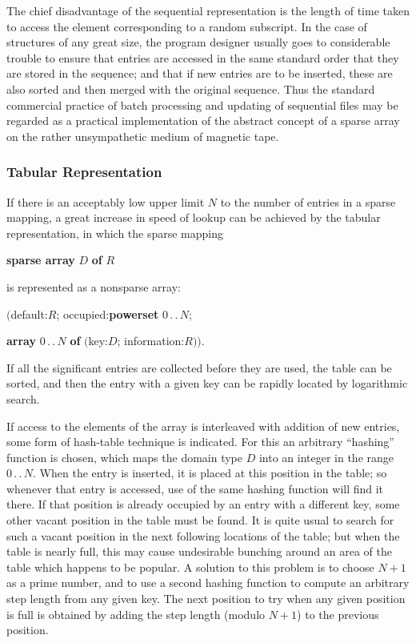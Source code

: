 The chief disadvantage of the sequential representation is the length of time taken to access the element corresponding to a random subscript. In the case of structures of any great size, the program designer usually goes to considerable trouble to ensure that entries are accessed in the same standard order that they are stored in the sequence; and that if new entries are to be inserted, these are also sorted and then merged with the original sequence. Thus the standard commercial practice of batch processing and updating of sequential files may be regarded as a practical implementation of the abstract concept of a sparse array on the rather unsympathetic medium of magnetic tape.

\subsubsection{Tabular Representation}

If there is an acceptably low upper limit $N$ to the number of entries in a sparse mapping, a great increase in speed of lookup can be achieved by the tabular representation, in which the sparse mapping

\quad \textbf{sparse array} $D$ \textbf{of} $R$

\noindent
is represented as a nonsparse array:

\quad $($default:$R$; occupied:\textbf{powerset} $0\,.\,.\,N$;

\tabto*{8em}\textbf{array} $0\,.\,.\,N$ \textbf{of} $($key:$D$; information:$R))$.

\noindent
If all the significant entries are collected before they are used, the table can be sorted, and then the entry with a given key can be rapidly located by logarithmic search.

If access to the elements of the array is interleaved with addition of new entries, some form of hash-table technique is indicated. For this an arbitrary ``hashing'' function is chosen, which maps the domain type $D$ into an integer in the range $0\,.\,.\,N$. When the entry is inserted, it is placed at this position in the table; so whenever that entry is accessed, use of the same hashing function will find it there. If that position is already occupied by an entry with a different key, some other vacant position in the table must be found. It is quite usual to search for such a vacant position in the next following locations of the table; but when the table is nearly full, this may cause undesirable bunching around an area of the table which happens to be popular. A solution to this problem is to choose $N + 1$ as a prime number, and to use a second hashing function to compute an arbitrary step length from any given key. The next position to try when any given position is full is obtained by adding the step length (modulo $N + 1$) to the previous position.

